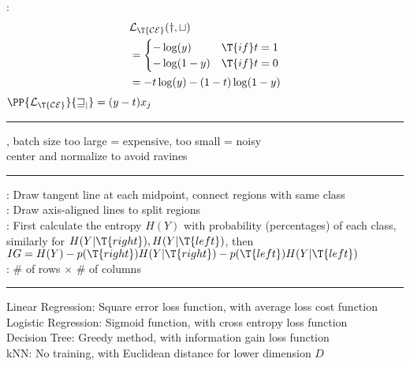 \documentclass[10pt]{CheatSheet/hw}
\begin{document}
\begin{multicols*}{5}
: \begin{align*}
    &\cal{L}_{\T{CE}}(y,t)\\
    &=\begin{cases}
        -\log(y) & \T{if } t=1\\
        -\log(1-y) & \T{if } t=0
    \end{cases}\\
    &= -t\log(y)-(1-t)\log(1-y)
\end{align*}
$\PP{\cal{L}_{\T{CE}}}{w_j}=(y-t)x_j$\\
\rule{\linewidth}{0.4pt}
, batch size too large = expensive, too small = noisy\\
center and normalize to avoid ravines\\
\rule{\linewidth}{0.4pt}
: Draw tangent line at each midpoint, connect regions with same class\\
: Draw axis-aligned lines to split regions\\
: First calculate the entropy $H(Y)$ with probability (percentages) of each class, similarly for $H(Y|\T{right}),H(Y|\T{left})$, then $IG=H(Y)-p(\T{right})H(Y|\T{right})-p(\T{left})H(Y|\T{left})$\\
: \# of rows $\times$ \# of columns\\
\rule{\linewidth}{0.4pt}
Linear Regression: Square error loss function, with average loss cost function\\
Logistic Regression: Sigmoid function, with cross entropy loss function\\
Decision Tree: Greedy method, with information gain loss function\\
kNN: No training, with Euclidean distance for lower dimension $D$\\
\end{multicols*}
\end{document}
